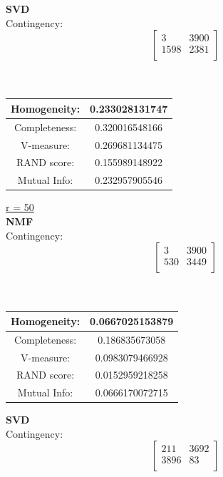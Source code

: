 \documentclass{report}
\begin{document}
\textbf{SVD} \\
Contingency: \[
\begin{bmatrix}
3 		& 3900 \\
1598 	& 2381 \\
\end{bmatrix}
\]
\\ \\

\begin{center}
\begin{tabu}{| c | c |}
\hline
Homogeneity: 		& 0.233028131747 \\
\hline
Completeness: 		& 0.320016548166 \\
\hline
V-measure: 			& 0.269681134475 \\
\hline
RAND score: 		& 0.155989148922 \\
\hline
Mutual Info: 		& 0.232957905546 \\
\hline
\end{tabu}
\end{center}


\underline{r = 50} \\
\textbf{NMF} \\
Contingency: \[
\begin{bmatrix}
3 		& 3900 \\
530 	& 3449 \\
\end{bmatrix}
\]
\\ \\

\begin{center}
\begin{tabu}{| c | c |}
\hline
Homogeneity: 		& 0.0667025153879 \\
\hline
Completeness: 		& 0.186835673058 \\
\hline
V-measure: 			& 0.0983079466928 \\
\hline
RAND score: 		& 0.0152959218258 \\
\hline
Mutual Info: 		& 0.0666170072715 \\
\hline
\end{tabu}
\end{center}


\textbf{SVD} \\
Contingency: \[
\begin{bmatrix}
211 		& 3692 \\
3896   		& 83 \\
\end{bmatrix}
\]
\\ \\ 
\end{document}
